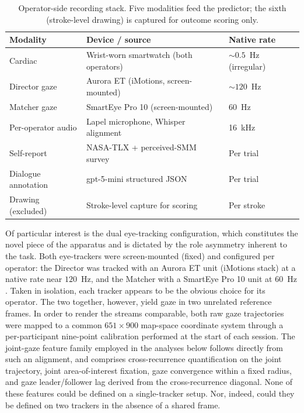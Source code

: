 \begin{table}[!t]
\caption[Operator-side recording stack]{Operator-side recording stack. Five modalities feed the predictor; the sixth (stroke-level drawing) is captured for outcome scoring only.}
\label{tab:modalities}
\centering
\small
\begin{tabular}{lll}
\toprule
Modality & Device / source & Native rate \\
\midrule
Cardiac & Wrist-worn smartwatch (both operators) & $\sim$$0.5$~Hz (irregular) \\
Director gaze & Aurora ET (iMotions, screen-mounted) & $\sim$$120$~Hz \\
Matcher gaze & SmartEye Pro 10 (screen-mounted) & $60$~Hz \\
Per-operator audio & Lapel microphone, Whisper alignment & 16~kHz \\
Self-report & NASA-TLX + perceived-SMM survey & Per trial \\
Dialogue annotation & gpt-5-mini structured JSON & Per trial \\
\midrule
Drawing (excluded) & Stroke-level capture for scoring & Per stroke \\
\bottomrule
\end{tabular}
\end{table}

Of particular interest is the dual eye-tracking configuration, which constitutes the novel piece of the apparatus and is dictated by the role asymmetry inherent to the task. Both eye-trackers were screen-mounted (fixed) and configured per operator: the Director was tracked with an Aurora ET unit (iMotions stack) at a native rate near $120$~Hz, and the Matcher with a SmartEye Pro 10 unit at $60$~Hz \cite{holmqvist2011eye,holmqvist2023eye,niehorster2024reporting}. Taken in isolation, each tracker appears to be the obvious choice for its operator. The two together, however, yield gaze in two unrelated reference frames. In order to render the streams comparable, both raw gaze trajectories were mapped to a common $651 \times 900$ map-space coordinate system through a per-participant nine-point calibration performed at the start of each session. The joint-gaze feature family employed in the analyses below follows directly from such an alignment, and comprises cross-recurrence quantification on the joint trajectory, joint area-of-interest fixation, gaze convergence within a fixed radius, and gaze leader/follower lag derived from the cross-recurrence diagonal. None of these features could be defined on a single-tracker setup. Nor, indeed, could they be defined on two trackers in the absence of a shared frame.


